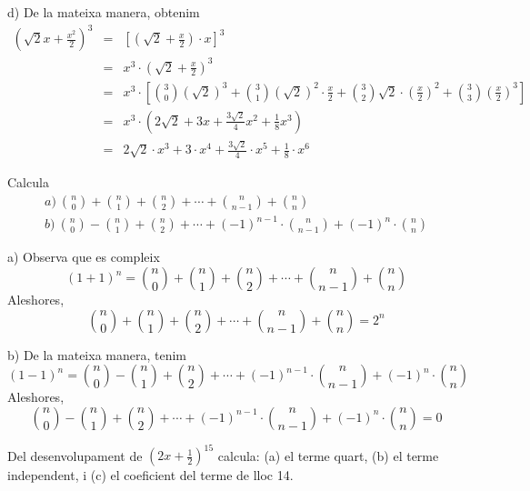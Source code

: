 \begin{solucio}
d) De la mateixa manera, obtenim\begin{eqnarray*}
\left( \sqrt{2}x+\frac{x^{2}}{2}\right) ^{3} &=&\left[ \left( \sqrt{2}+\frac{x}{2}\right) \cdot x\right] ^{3} \\
&=&x^{3}\cdot \left( \sqrt{2}+\frac{x}{2}\right) ^{3} \\
&=&x^{3}\cdot \left[ \binom{3}{0}(\sqrt{2})^{3}+\binom{3}{1}(\sqrt{2})^{2}\cdot \frac{x}{2}+\binom{3}{2}\sqrt{2}\cdot \left( \frac{x}{2}\right)
^{2}+\binom{3}{3}\left( \frac{x}{2}\right) ^{3}\right] \\
&=&x^{3}\cdot \left( 2\sqrt{2}+3x+\frac{3\sqrt{2}}{4}x^{2}+\frac{1}{8}x^{3}\right) \\
&=&2\sqrt{2}\cdot x^{3}+3\cdot x^{4}+\frac{3\sqrt{2}}{4}\cdot x^{5}+\frac{1}{8}\cdot x^{6}
\end{eqnarray*}
\end{solucio}

\begin{exercici}
Calcula\[
\begin{array}{l}
a)~\binom{n}{0}+\binom{n}{1}+\binom{n}{2}+\cdots +\binom{n}{n-1}+\binom{n}{n}
\\
b)~\binom{n}{0}-\binom{n}{1}+\binom{n}{2}+\cdots +(-1)^{n-1}\cdot \binom{n}{n-1}+(-1)^{n}\cdot \binom{n}{n}\end{array}\]
\end{exercici}

\begin{solucio}
a) Observa que es compleix\[
\left( 1+1\right) ^{n}=\binom{n}{0}+\binom{n}{1}+\binom{n}{2}+\cdots +\binom{n}{n-1}+\binom{n}{n}
\]Aleshores,\[
\binom{n}{0}+\binom{n}{1}+\binom{n}{2}+\cdots +\binom{n}{n-1}+\binom{n}{n}=2^{n}
\]

b) De la mateixa manera, tenim\[
\left( 1-1\right) ^{n}=\binom{n}{0}-\binom{n}{1}+\binom{n}{2}+\cdots
+(-1)^{n-1}\cdot \binom{n}{n-1}+(-1)^{n}\cdot \binom{n}{n}
\]Aleshores,\[
\binom{n}{0}-\binom{n}{1}+\binom{n}{2}+\cdots +(-1)^{n-1}\cdot \binom{n}{n-1}+(-1)^{n}\cdot \binom{n}{n}=0
\]
\end{solucio}

\begin{exercici}
Del desenvolupament de $\left( 2x+\frac{1}{2}\right) ^{15}$ calcula: (a) el terme quart, (b) el terme independent, i (c) el coeficient del terme de lloc 14.
\end{exercici}

